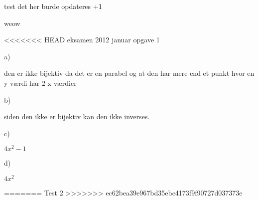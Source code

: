 \documentclass{article}
\begin{document}
test
det her burde opdateres
+1

weow

<<<<<<< HEAD
eksamen 2012 januar
opgave 1 

a)

den er ikke bijektiv da det er en parabel og at den har mere end et punkt
hvor en y værdi har 2 x værdier 

b)

siden den ikke er bijektiv kan den ikke inverses.

c)

$4x^2-1$

d)

$4x^2$




=======
Test 2
>>>>>>> ec62bea39e967bd35ebc4173f9f90727d037373e
\end{document}
